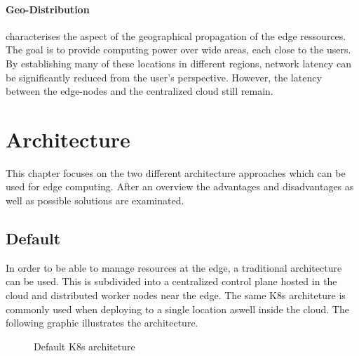 \documentclass[MSC,Master,english]{twbook}%
\begin{document}
\paragraph{Geo-Distribution} characterises the aspect of the geographical propagation of the edge ressources. The goal is to provide computing power over wide areas, each close to the users. By establishing many of these locations in different regions, network latency can be significantly reduced from the user's perspective. However, the latency between the edge-nodes and the centralized cloud still remain.


\section{Architecture}
\label{sec:architecture}
This chapter focuses on the two different architecture approaches which can be used for edge computing. After an overview the advantages and disadvantages as well as possible solutions are examinated.

\subsection{Default}
In order to be able to manage resources at the edge, a traditional architecture can be used. This is subdivided into a centralized control plane hosted in the cloud and distributed worker nodes near the edge. The same \ac{K8s} architeture is commonly used when deploying to a single location aswell inside the cloud. The following graphic illustrates the architecture.

\begin{figure}[ht]
    \centering
    \caption{Default \ac{K8s} architeture}
    \label{fig:k8s-default}
\end{figure}
\end{document}
